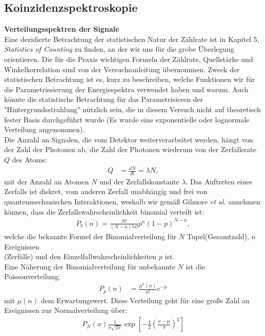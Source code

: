 \documentclass[%
aps,
onecolumn,
11pt,
tightenlines,
nofootinbib,
superscriptaddress,
floatfix,
prd,
]{revtex4-2}
\begin{document}
\subsection{Koinzidenzspektroskopie}
\label{sec:Koinzidenzspektroskopie}
\noindent \textbf{Verteilungsspektren der Signale}\\
Eine dezidierte Betrachtung der statistischen Natur der Zählrate ist in \cite{gilmore2008practical} Kapitel 5, \textit{Statistics of Counting} zu finden, an der wir uns für die grobe Überlegung orientieren. Die für die Praxis wichtigen Formeln der Zählrate, Quellstärke und Winkelkorrelation sind von der Versuchsanleitung \cite{manual1} übernommen. Zweck der statistischen Betrachtung ist es, kurz zu beschreiben, welche Funktionen wir für die Parametriesierung der Energiespektra verwendet haben und warum. Auch könnte die statistische Betrachtung für das Parametrisieren der "Hintergrundsstrahlung" nützlich sein, die in diesem Versuch nicht auf theoretisch fester Basis durchgeführt wurde (Es wurde eine exponentielle oder lognormale Verteilung angenommen).\\
Die Anzahl an Signalen, die vom Detektor weiterverarbeitet werden, hängt von der Zahl der Photonen ab, die Zahl der Photonen wiederum von der Zerfallsrate $Q$ des Atoms:
\begin{align}
	Q &= \frac{dN}{dt} = \lambda N, 
\end{align}
mit der Anzahl an Atomen $N$ und der Zerfallskonstante $\lambda$. Das Auftreten eines Zerfalls ist diskret, vom anderen Zerfall unabhängig und frei von quantenmechanischen Interaktionen, weshalb wir gemäß Gilmore \textit{et al.} annehmen können, dass die Zerfallswahrscheinlichkeit binomial verteilt ist:
\begin{align}
	P_b(n) = \frac{N!}{(N - n)!n!}p^n(1-p)^{N-n},
\end{align}
welche die bekannte Formel der Binomialverteilung für $N$ Tupel(Gesamtzahl), $n$ Ereignissen \\(Zerfälle) und den Einzelfallwahrscheinlichkeiten $p$ ist. \\
Eine Näherung der Binomialverteilung für unbekannte $N$ ist die Poissonverteilung:
\begin{align}
	P_p(n) &= \frac{\mu^n(n)}{n!}e^{-\mu}
\end{align}
mit $\mu(n)$ dem Erwartungswert. Diese Verteilung geht für eine große Zahl an Ereignissen zur Normalverteilung über:
\begin{align}
	\label{eq:gaussian}
	P_N(x)\frac{1}{\sigma \sqrt{2\pi}} \exp \left[ -\frac{1}{2} \left( \frac{x-\mu}{\sigma} \right)^2 \right ]
\end{align}
\end{document}
